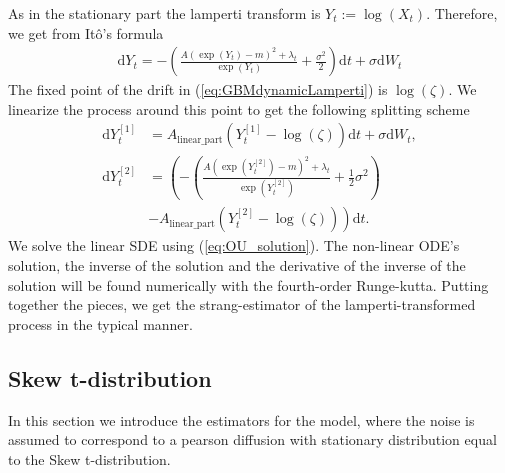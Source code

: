 As in the stationary part the lamperti transform is $Y_t:=\log(X_t)$. Therefore, we get from Itô's formula
\begin{align}
    \mathrm{d}Y_t = - \left(\frac{A\left(\exp\left(Y_t\right)-m\right)^2 + \lambda_t}{\exp(Y_t)} + \frac{\sigma^2}{2}\right)\mathrm{d}t + \sigma \mathrm{d}W_t \label{eq:GBMdynamicLamperti}
\end{align}
The fixed point of the drift in (\ref{eq:GBMdynamicLamperti}) is $\log\left(\zeta\right)$. We linearize the process around this point to get the following splitting scheme
\begin{align}
    \mathrm{d}Y_t^{[1]} &= A_{\mathrm{linear\_part}}\left(Y_t^{[1]} - \log\left(\zeta\right)\right)\mathrm{d}t + \sigma \mathrm{d}W_t,\\
    \mathrm{d}Y_t^{[2]} &= \left(-\left(\frac{A\left(\exp\left(Y_t^{[2]}\right)-m\right)^2 + \lambda_t}{\exp\left(Y_t^{[2]}\right)} + \frac{1}{2}\sigma^2\right) \right. \nonumber \\
     &- \left. A_{\mathrm{linear\_part}}\left(Y_t^{[2]} - \log\left(\zeta\right)\right)\right)\mathrm{d}t.
\end{align}
We solve the linear SDE using (\ref{eq:OU_solution}). The non-linear ODE's solution, the inverse of the solution and the derivative of the inverse of the solution will be found numerically with the fourth-order Runge-kutta. Putting together the pieces, we get the strang-estimator of the lamperti-transformed process in the typical manner.
\subsection{Skew t-distribution}
In this section we introduce the estimators for the model, where the noise is assumed to correspond to a pearson diffusion with stationary distribution equal to the Skew t-distribution.
